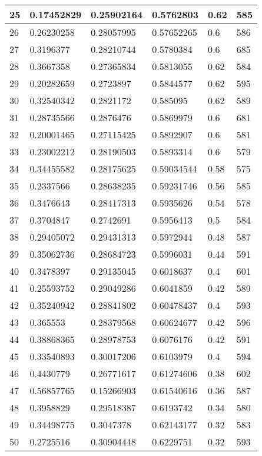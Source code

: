 \begin{longtable}{|l|l|l|l|l|l|}
25 & 0.17452829 & 0.25902164 & 0.5762803 & 0.62 & 585 \\ \hline 
26 & 0.26230258 & 0.28057995 & 0.57652265 & 0.6 & 586 \\ \hline 
27 & 0.3196377 & 0.28210744 & 0.5780384 & 0.6 & 685 \\ \hline 
28 & 0.3667358 & 0.27365834 & 0.5813055 & 0.62 & 584 \\ \hline 
29 & 0.20282659 & 0.2723897 & 0.5844577 & 0.62 & 595 \\ \hline 
30 & 0.32540342 & 0.2821172 & 0.585095 & 0.62 & 589 \\ \hline 
31 & 0.28735566 & 0.2876476 & 0.5869979 & 0.6 & 681 \\ \hline 
32 & 0.20001465 & 0.27115425 & 0.5892907 & 0.6 & 581 \\ \hline 
33 & 0.23002212 & 0.28190503 & 0.5893314 & 0.6 & 579 \\ \hline 
34 & 0.34455582 & 0.28175625 & 0.59034544 & 0.58 & 575 \\ \hline 
35 & 0.2337566 & 0.28638235 & 0.59231746 & 0.56 & 585 \\ \hline 
36 & 0.3476643 & 0.28417313 & 0.5935626 & 0.54 & 578 \\ \hline 
37 & 0.3704847 & 0.2742691 & 0.5956413 & 0.5 & 584 \\ \hline 
38 & 0.29405072 & 0.29431313 & 0.5972944 & 0.48 & 587 \\ \hline 
39 & 0.35062736 & 0.28684723 & 0.5996031 & 0.44 & 591 \\ \hline 
40 & 0.3478397 & 0.29135045 & 0.6018637 & 0.4 & 601 \\ \hline 
41 & 0.25593752 & 0.29049286 & 0.6041859 & 0.42 & 589 \\ \hline 
42 & 0.35240942 & 0.28841802 & 0.60478437 & 0.4 & 593 \\ \hline 
43 & 0.365553 & 0.28379568 & 0.60624677 & 0.42 & 596 \\ \hline 
44 & 0.38868365 & 0.28978753 & 0.6076176 & 0.42 & 591 \\ \hline 
45 & 0.33540893 & 0.30017206 & 0.6103979 & 0.4 & 594 \\ \hline 
46 & 0.4430779 & 0.26771617 & 0.61274606 & 0.38 & 602 \\ \hline 
47 & 0.56857765 & 0.15266903 & 0.61540616 & 0.36 & 587 \\ \hline 
48 & 0.3958829 & 0.29518387 & 0.6193742 & 0.34 & 580 \\ \hline 
49 & 0.34498775 & 0.3047378 & 0.62143177 & 0.32 & 583 \\ \hline 
50 & 0.2725516 & 0.30904448 & 0.6229751 & 0.32 & 593 \\ \hline 
\end{longtable}